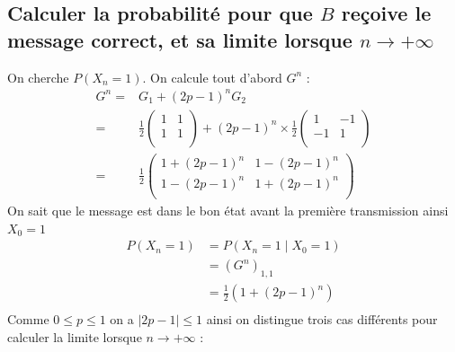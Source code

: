 \documentclass[10pt,a4paper,twoside]{article}
\begin{document}
\subsection{Calculer la probabilité pour que $B$ reçoive le message correct, et sa limite lorsque $n\rightarrow +\infty$}
On cherche $P(X_{n}=1)$. On calcule tout d'abord $G^{n}$ :
\begin{align*}
G^{n} =& G_{1}+(2p-1)^{n}G_{2}\\
=& \frac{1}{2}\left(\begin{array}{cc}
 1 & 1\\
 1 & 1 \\
\end{array}\right) + (2p-1)^{n} \times \frac{1}{2}\left(\begin{array}{cc}
 1 & -1\\
 -1 & 1 \\
\end{array}\right)\\
=& \frac{1}{2}\left(\begin{array}{cc}
 1+(2p-1)^{n} & 1-(2p-1)^{n}\\
 1-(2p-1)^{n} & 1+(2p-1)^{n} \\
\end{array}\right)
\end{align*}
On sait que le message est dans le bon état avant la première transmission ainsi $X_{0}=1$
\begin{align*}
P(X_{n}=1) &= P(X_{n}=1\mid X_{0}=1)\\
&= (G^{n})_{1,1}\\
&= \frac{1}{2}\left(1+(2p-1)^{n}\right)\\
\end{align*}
Comme $0\leqslant p \leqslant 1$ on a $|2p-1|\leqslant 1$ ainsi on distingue trois cas différents pour calculer la limite lorsque $n\rightarrow +\infty$ :
\end{document}
